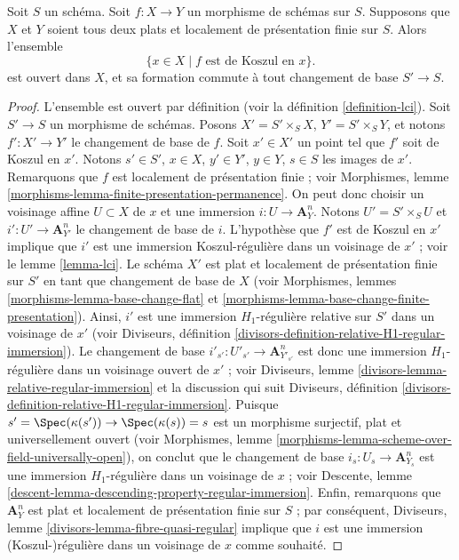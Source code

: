 \begin{lemma}
\label{lemma-base-change-lci-fibres}
Soit $S$ un schéma. Soit $f : X \to Y$ un morphisme de schémas sur $S$.
Supposons que $X$ et $Y$ soient tous deux plats et localement de présentation finie sur $S$.
Alors l'ensemble
$$
\{x \in X \mid f\text{ est de Koszul en }x\}.
$$
est ouvert dans $X$, et sa formation commute à tout changement de base
$S' \to S$.
\end{lemma}

\begin{proof}
L'ensemble est ouvert par définition (voir la
définition \ref{definition-lci}).
Soit $S' \to S$ un morphisme de schémas. Posons $X' = S' \times_S X$,
$Y' = S' \times_S Y$, et notons $f' : X' \to Y'$ le changement de base de $f$.
Soit $x' \in X'$ un point tel que $f'$ soit de Koszul en $x'$. Notons
$s' \in S'$, $x \in X$, $y' \in Y'$, $y \in Y$, $s \in S$ les images
de $x'$. Remarquons que $f$ est localement de présentation finie ; voir
Morphismes, lemme \ref{morphisms-lemma-finite-presentation-permanence}.
On peut donc choisir un voisinage affine $U \subset X$ de
$x$ et une immersion $i : U \to \mathbf{A}^n_Y$. Notons $U' = S' \times_S U$
et $i' : U' \to \mathbf{A}^n_{Y'}$ le changement de base de $i$.
L'hypothèse que $f'$ est de Koszul en $x'$ implique que $i'$ est une
immersion Koszul-régulière dans un voisinage de $x'$ ; voir
le lemme \ref{lemma-lci}.
Le schéma $X'$ est plat et localement de
présentation finie sur $S'$ en tant que changement de base de $X$ (voir
Morphismes, lemmes \ref{morphisms-lemma-base-change-flat} et
\ref{morphisms-lemma-base-change-finite-presentation}).
Ainsi, $i'$ est une immersion $H_1$-régulière relative sur $S'$
dans un voisinage de $x'$ (voir
Diviseurs, définition \ref{divisors-definition-relative-H1-regular-immersion}).
Le changement de base $i'_{s'} : U'_{s'} \to \mathbf{A}^n_{Y'_{s'}}$ est donc
une immersion $H_1$-régulière dans un voisinage ouvert de $x'$ ; voir
Diviseurs, lemme \ref{divisors-lemma-relative-regular-immersion}
et la discussion qui suit
Diviseurs, définition \ref{divisors-definition-relative-H1-regular-immersion}.
Puisque $s' = \Spec(\kappa(s')) \to \Spec(\kappa(s)) = s$
est un morphisme surjectif, plat et universellement ouvert (voir
Morphismes, lemme \ref{morphisms-lemma-scheme-over-field-universally-open}),
on conclut que le changement de base $i_s : U_s \to \mathbf{A}^n_{Y_s}$ est une
immersion $H_1$-régulière dans un voisinage de $x$ ; voir
Descente, lemme \ref{descent-lemma-descending-property-regular-immersion}.
Enfin, remarquons que $\mathbf{A}^n_Y$ est plat et localement de
présentation finie sur $S$ ; par conséquent,
Diviseurs, lemme \ref{divisors-lemma-fibre-quasi-regular}
implique que $i$ est une immersion (Koszul-)régulière dans un voisinage de $x$
comme souhaité.
\end{proof}

